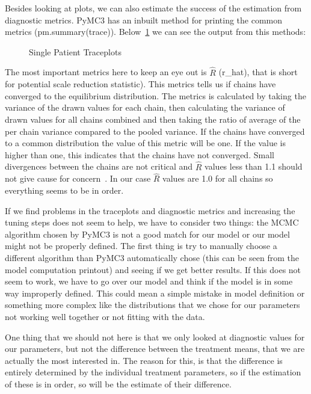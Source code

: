 \documentclass[12pt,a4paper,leqno]{report}
\theoremstyle{plain}
\theoremstyle{definition}
\theoremstyle{remark}
\begin{document}
Besides looking at plots, we can also estimate the success of the estimation from
diagnostic metrics. PyMC3 has an inbuilt method for printing the common metrics
(pm.summary(trace)). Below\ \ref{singlepatientdiagnosticmetrics} we can see the output from this methods:

\bigskip
\begin{figure}[H]
    \caption{Single Patient Traceplots}
    \label{singlepatientdiagnosticmetrics}
    \bigskip
    
\end{figure}
\bigskip

The most important metrics here to keep an eye out is \(\hat{R}\) (r\_hat), that is short for potential scale
reduction statistic). This metrics tells us if
chains have converged to the equilibrium distribution. The metrics is calculated by
taking the variance of the drawn values for each chain,
then calculating the variance of drawn values for all chains combined and then taking the
ratio of average of the per chain variance compared to the pooled variance. If the
chains have converged to a common distribution the value of this metric will be one. If
the value is higher than one, this indicates that the chains have not converged. Small
divergences between the chains are not critical and \(\hat{R}\) values less than 1.1 should
not give cause for concern\ \cite{rhatrule}. In our case \(\hat{R}\) values are 1.0 for
all chains so everything seems to be in order.

If we find problems in the traceplots and diagnostic metrics and increasing the tuning
steps does not seem to help, we have to consider two things: the
MCMC algorithm chosen by PyMC3 is not a good match for our model or our model might not
be properly defined. The first thing is try to manually choose a different algorithm than
PyMC3 automatically chose (this can be seen from the model computation printout) and seeing
if we get better results. If this does not seem to work, we have to go over our model and
think if the model is in some way improperly defined. This could mean a simple mistake
in model definition or something more complex like the distributions that we chose for
our parameters not working well together or not fitting with the data.

One thing that we should not here is that we only looked at diagnostic values for our
parameters, but not the difference between the treatment means, that we are actually the
most interested in. The reason for this, is that the difference is entirely determined
by the individual treatment parameters, so if the estimation of these is in order, so
will be the estimate of their difference.
\end{document}
